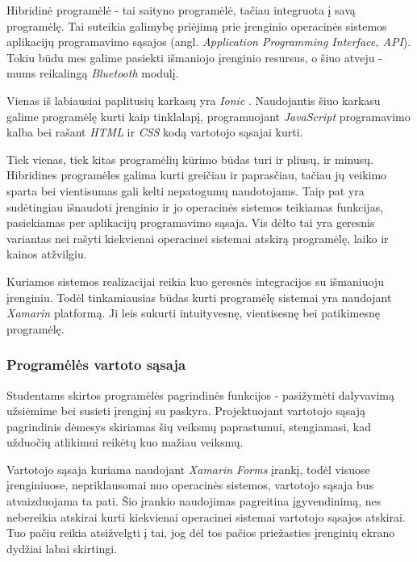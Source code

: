 \documentclass{VUMIFPSkursinis}
\begin{document}

Hibridinė programėlė - tai saityno programėlė, tačiau integruota į 	savą programėlę. Tai suteikia galimybę priėjimą prie įrenginio operacinės sistemos aplikacijų programavimo sąsajos (angl. \textit{Application Programming Interface, API}). Tokiu būdu mes galime pasiekti išmaniojo įrenginio resursus, o šiuo atveju - mums reikalingą \textit{Bluetooth} modulį.

Vienas iš labiausiai paplitusių karkasų yra \textit{Ionic} \cite{hybridFrameworks}. Naudojantis šiuo karkasu galime programėlę kurti kaip tinklalapį, programuojant \textit{JavaScript} programavimo kalba bei rašant \textit{HTML} ir \textit{CSS} kodą vartotojo sąsajai kurti.


Tiek vienas, tiek kitas programėlių kūrimo būdas turi ir pliusų, ir minusų. Hibridines programėles galima kurti greičiau ir paprasčiau, tačiau jų veikimo sparta bei vientisumas gali kelti nepatogumų naudotojams. Taip pat yra sudėtingiau išnaudoti įrenginio ir jo operacinės sistemos teikiamas funkcijas, pasiekiamas per aplikacijų programavimo sąsaja. Vis dėlto tai yra geresnis variantas nei rašyti kiekvienai operacinei sistemai atskirą programėlę, laiko ir kainos atžvilgiu.

Kuriamos sistemos realizacijai reikia kuo geresnės integracijos su išmaniuoju įrenginiu. Todėl tinkamiausias būdas kurti programėlę sistemai yra naudojant \textit{Xamarin} platformą. Ji leis sukurti intuityvesnę, vientisesnę bei patikimesnę programėlę.

\subsubsection{Programėlės vartoto sąsaja}

Studentams skirtos programėlės pagrindinės funkcijos - pasižymėti dalyvavimą užsiėmime bei susieti įrenginį su paskyra. Projektuojant vartotojo sąsają pagrindinis dėmesys skiriamas šių veiksmų paprastumui, stengiamasi, kad užduočių atlikimui reikėtų kuo mažiau veiksmų.

Vartotojo sąsaja kuriama naudojant \textit{Xamarin Forms} įrankį, todėl visuose įrenginiuose, nepriklausomai nuo operacinės sistemos, vartotojo sąsaja bus atvaizduojama ta pati. Šio įrankio naudojimas pagreitina įgyvendinimą, nes nebereikia atskirai kurti kiekvienai operacinei sistemai vartotojo sąsajos atskirai. Tuo pačiu reikia atsižvelgti į tai, jog dėl tos pačios priežasties įrenginių ekrano dydžiai labai skirtingi.
\end{document}
